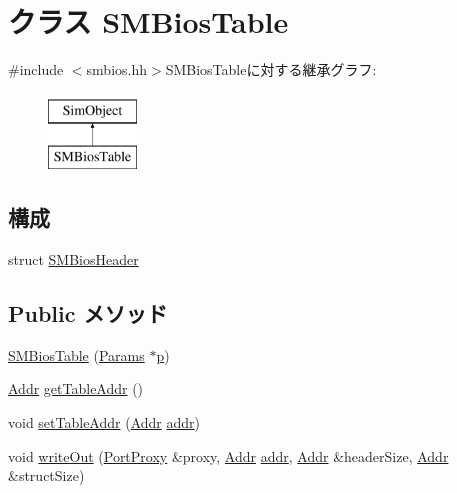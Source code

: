 \hypertarget{classX86ISA_1_1SMBios_1_1SMBiosTable}{
\section{クラス SMBiosTable}
\label{classX86ISA_1_1SMBios_1_1SMBiosTable}
}


{\ttfamily \#include $<$smbios.hh$>$}SMBiosTableに対する継承グラフ:\begin{figure}[H]
\begin{center}
\leavevmode
\includegraphics[height=2cm]{classX86ISA_1_1SMBios_1_1SMBiosTable}
\end{center}
\end{figure}
\subsection*{構成}
\begin{DoxyCompactItemize}
\item 
struct \hyperlink{structX86ISA_1_1SMBios_1_1SMBiosTable_1_1SMBiosHeader}{SMBiosHeader}
\end{DoxyCompactItemize}
\subsection*{Public メソッド}
\begin{DoxyCompactItemize}
\item 
\hyperlink{classX86ISA_1_1SMBios_1_1SMBiosTable_ace99a7f5fa8efd3e8c7b26adbd98f7f3}{SMBiosTable} (\hyperlink{classX86ISA_1_1SMBios_1_1SMBiosTable_a53bcb95b42fba31b72dea12caeeed9cf}{Params} $\ast$\hyperlink{namespaceX86ISA_af675c1d542a25b96e11164b80809a856}{p})
\item 
\hyperlink{base_2types_8hh_af1bb03d6a4ee096394a6749f0a169232}{Addr} \hyperlink{classX86ISA_1_1SMBios_1_1SMBiosTable_ad2b5276c95bbec6102bd1b9f1eb8ea26}{getTableAddr} ()
\item 
void \hyperlink{classX86ISA_1_1SMBios_1_1SMBiosTable_aeaa306e0b92006f1478facf62f5d93d9}{setTableAddr} (\hyperlink{base_2types_8hh_af1bb03d6a4ee096394a6749f0a169232}{Addr} \hyperlink{namespaceX86ISA_ab705917f60c5566f9ce56a93f798b2e2}{addr})
\item 
void \hyperlink{classX86ISA_1_1SMBios_1_1SMBiosTable_ac061b4f51e0ec5b55cdadd9c58d96da9}{writeOut} (\hyperlink{classPortProxy}{PortProxy} \&proxy, \hyperlink{base_2types_8hh_af1bb03d6a4ee096394a6749f0a169232}{Addr} \hyperlink{namespaceX86ISA_ab705917f60c5566f9ce56a93f798b2e2}{addr}, \hyperlink{base_2types_8hh_af1bb03d6a4ee096394a6749f0a169232}{Addr} \&headerSize, \hyperlink{base_2types_8hh_af1bb03d6a4ee096394a6749f0a169232}{Addr} \&structSize)
\end{DoxyCompactItemize}
